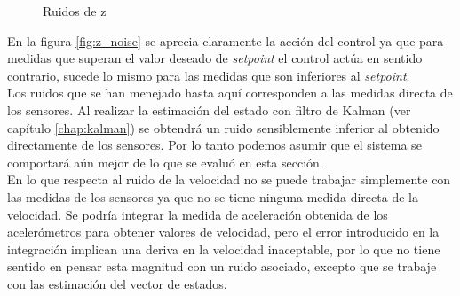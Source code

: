 \documentclass[main]{subfiles}
\begin{document}
\begin{figure}[h!]
  \centering
  \caption{Ruidos de z}
  \label{fig:ruidos_z}
\end{figure}

En la figura \ref{fig:z_noise} se aprecia claramente la acci\'on del control ya que para medidas que superan el valor deseado de \emph{setpoint} el control act\'ua en sentido contrario, sucede lo mismo para las medidas que son inferiores al \emph{setpoint}.\\

Los ruidos que se han menejado hasta aqu\'i corresponden a las medidas directa de los sensores. Al realizar la estimaci\'on del estado con filtro de Kalman (ver cap\'itulo \ref{chap:kalman}) se obtendr\'a un ruido sensiblemente inferior al obtenido directamente de los sensores. Por lo tanto podemos asumir que el sistema se comportar\'a a\'un mejor de lo que se evalu\'o en esta secci\'on.\\

En lo que respecta al ruido de la velocidad no se puede trabajar simplemente con las medidas de los sensores ya que no se tiene ninguna medida directa de la velocidad. Se podr\'ia integrar la medida de aceleraci\'on obtenida de los aceler\'ometros para obtener valores de velocidad, pero el error introducido en la integraci\'on implican una deriva en la velocidad inaceptable, por lo que no tiene sentido en pensar esta magnitud con un ruido asociado, excepto que se trabaje con las estimaci\'on del vector de estados.\\ 
\end{document}
